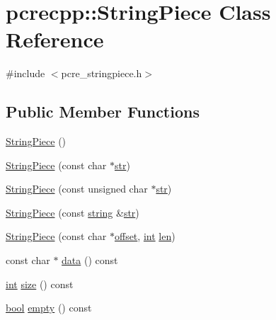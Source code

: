 \hypertarget{classpcrecpp_1_1StringPiece}{}\section{pcrecpp\+:\+:String\+Piece Class Reference}
\label{classpcrecpp_1_1StringPiece}


{\ttfamily \#include $<$pcre\+\_\+stringpiece.\+h$>$}

\subsection*{Public Member Functions}
\begin{DoxyCompactItemize}
\item 
\hyperlink{classpcrecpp_1_1StringPiece_a7c718dc012fc1e59f21698a5c9213194}{String\+Piece} ()
\item 
\hyperlink{classpcrecpp_1_1StringPiece_a88cdd56c71912aeba1288d0d8e97cd0d}{String\+Piece} (const char $\ast$\hyperlink{group__APR__Util__Bucket__Brigades_ga6a62b60443be1d042194af15ce934193}{str})
\item 
\hyperlink{classpcrecpp_1_1StringPiece_a332fccf20ecd5c6249c19f620971f6f3}{String\+Piece} (const unsigned char $\ast$\hyperlink{group__APR__Util__Bucket__Brigades_ga6a62b60443be1d042194af15ce934193}{str})
\item 
\hyperlink{classpcrecpp_1_1StringPiece_ac53a80f6dc3f78255a187b8528c68839}{String\+Piece} (const \hyperlink{pcre_8txt_ad52baeed02a03dda73cbe504945c9c35}{string} \&\hyperlink{group__APR__Util__Bucket__Brigades_ga6a62b60443be1d042194af15ce934193}{str})
\item 
\hyperlink{classpcrecpp_1_1StringPiece_aca4583de72e2d3c415b8145fbba1b529}{String\+Piece} (const char $\ast$\hyperlink{group__APR__Util__Bucket__Brigades_ga0feae9f93d4bc5dca392194c513e0921}{offset}, \hyperlink{pcre_8txt_a42dfa4ff673c82d8efe7144098fbc198}{int} \hyperlink{group__APR__Util__XML_ga1e9401816e3a1cf930f448db46978ea7}{len})
\item 
const char $\ast$ \hyperlink{classpcrecpp_1_1StringPiece_a5febee43595634c41b81c39c1c4c8c94}{data} () const 
\item 
\hyperlink{pcre_8txt_a42dfa4ff673c82d8efe7144098fbc198}{int} \hyperlink{classpcrecpp_1_1StringPiece_aacd70a8a8e2dedf3a274cb5082c14ba1}{size} () const 
\item 
\hyperlink{aplibtool_8c_ad5c9d4ba3dc37783a528b0925dc981a0}{bool} \hyperlink{classpcrecpp_1_1StringPiece_ad16dff48de1287a17a33c23746952264}{empty} () const 

\end{DoxyCompactItemize}
